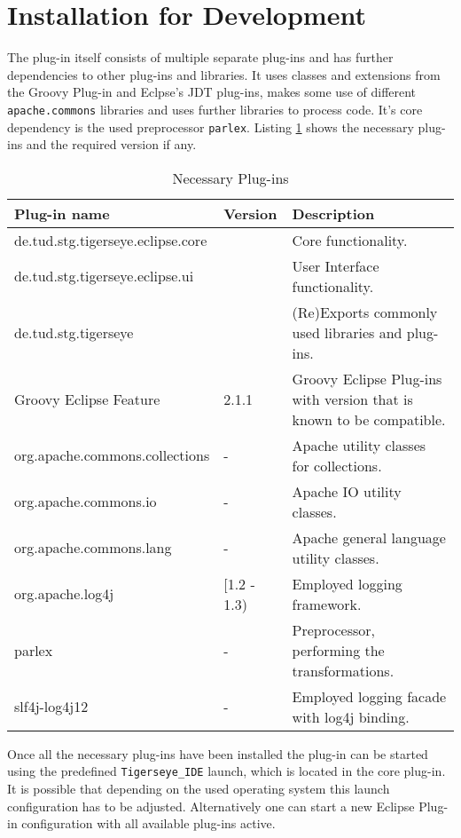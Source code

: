 

  \section{Installation for Development}
	
	The \tiger plug-in itself consists of multiple separate plug-ins and has further dependencies to other plug-ins and libraries. It uses classes and extensions from the Groovy Plug-in and  Eclpse's JDT plug-ins, makes some use of different \texttt{apache.commons} libraries and uses further libraries to process code. It's core dependency is the used preprocessor \texttt{parlex}. Listing \ref{lst:dependencies} shows the necessary plug-ins and the required version if any.
	
	
	\begin{table}
	\centering
	  \begin{tabular}{|l|l|p{}|}
		\hline
		Plug-in name & Version & Description\\ \hline	
		de.tud.stg.tigerseye.eclipse.core & \versionnum & Core functionality.\\
		de.tud.stg.tigerseye.eclipse.ui& \versionnum & User Interface functionality.\\
		de.tud.stg.tigerseye & \versionnum & (Re)Exports commonly used libraries and plug-ins.\\
		Groovy Eclipse Feature & 2.1.1 & Groovy Eclipse Plug-ins with version that is known to be compatible.\\
		org.apache.commons.collections & - & Apache utility classes for collections.\\
		org.apache.commons.io & - & Apache IO utility classes.\\
		org.apache.commons.lang& - & Apache general language utility classes.\\
		org.apache.log4j & [1.2 - 1.3) & Employed logging framework.\\
		parlex & - & Preprocessor, performing the transformations. \\
		slf4j-log4j12 & - & Employed logging facade with log4j binding.\\
		\hline
	  \end{tabular}
	  \caption{Necessary Plug-ins}\label{lst:dependencies}\label{lst:dependencies}
	\end{table}
	

	Once all the necessary plug-ins have been installed the \tiger plug-in can be started using the predefined \texttt{Tigerseye\_IDE} launch, which is located in the core plug-in. 
	It is possible that depending on the used operating system this launch configuration has to be adjusted. Alternatively one can start a new Eclipse Plug-in configuration with all available plug-ins active.
	